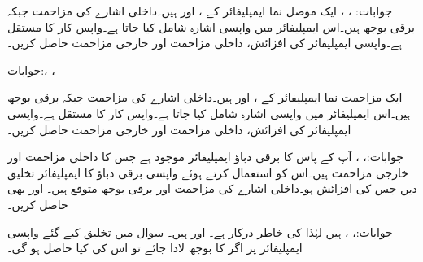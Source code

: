 جوابات: ، ، 
ایک موصل نما ایمپلیفائر کے ،  اور
  ہیں۔داخلی اشارے کی مزاحمت  جبکہ برقی بوجھ  ہیں۔اس ایمپلیفائر میں واپسی اشارہ شامل کیا جاتا ہے۔واپس کار کا مستقل  ہے۔واپسی ایمپلیفائر کی افزائش، داخلی مزاحمت اور خارجی مزاحمت حاصل کریں۔

جوابات:، ، 

ایک مزاحمت نما ایمپلیفائر کے ،  اور
  ہیں۔داخلی اشارے کی مزاحمت  جبکہ برقی بوجھ  ہیں۔اس ایمپلیفائر میں واپسی اشارہ شامل کیا جاتا ہے۔واپس کار کا مستقل  ہے۔واپسی ایمپلیفائر کی افزائش، داخلی مزاحمت اور خارجی مزاحمت حاصل کریں۔

جوابات:، ، 
آپ کے پاس  کا برقی دباؤ ایمپلیفائر موجود ہے جس کا داخلی مزاحمت  اور خارجی مزاحمت  ہیں۔اس کو استعمال کرتے ہوئے واپسی برقی دباؤ کا ایمپلیفائر تخلیق دیں جس کی افزائش  ہو۔داخلی اشارے کی مزاحمت  اور برقی بوجھ  متوقع ہیں۔ اور  بھی حاصل کریں۔

جوابات:، ،  ہیں لہٰذا  کی خاطر  درکار ہے۔ اور  ہیں۔
سوال  میں تخلیق کیے گئے واپسی ایمپلیفائر پر اگر  کا بوجھ لادا جائے تو اس کی  کیا حاصل ہو گی۔


